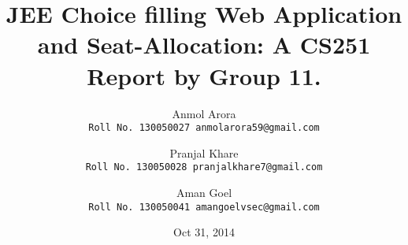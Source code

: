 \documentclass[]{beamer}%
\title{JEE Choice filling Web Application and Seat-Allocation: A CS251 Report by Group 11.}
\author{
	Anmol Arora \\
   \texttt{Roll No. 130050027
    anmolarora59@gmail.com}\\
\and
Pranjal Khare \\
    \texttt{Roll No. 130050028 
    pranjalkhare7@gmail.com}\\
\and
Aman Goel \\
    \texttt{Roll No. 130050041 
    amangoelvsec@gmail.com}\\
}
\date{Oct 31, 2014}
\begin{document}
\begin{frame}
\titlepage
\end{frame}






\end{document}
